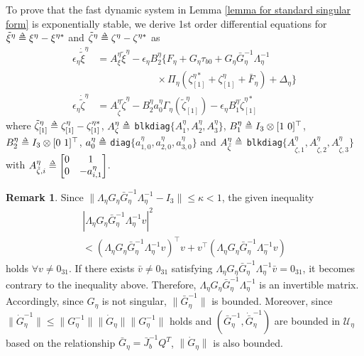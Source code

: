 \documentclass[letterpaper, 10 pt, conference]{ieeeconf}  %
\def\delequal{\mathrel{\ensurestackMath{\stackon[1pt]{=}{\scriptscriptstyle\Delta}}}}
\theoremstyle{definition}
\newtheorem{remark}{Remark}
\begin{document}
To prove that the fast dynamic system in Lemma \ref{lemma for standard singular form} is exponentially stable, we derive 1st order differential equations for $\tilde{\xi}^{\eta} \delequal \xi^{\eta}-\xi^{\eta *}$ and $\tilde{\zeta}^{\eta} \delequal \zeta^{\eta}-\zeta^{\eta *}$ as
\begin{equation} \label{eq: error dynamics of xi and zeta}
    \begin{split}
         \epsilon_{\eta}\dot{\tilde{\xi}}^{\eta} &= A^{\eta}_{\xi}\tilde{\xi}^{\eta} - \epsilon_{\eta} B^{\eta}_2 \{ F_{\eta} + G_{\eta} \tau_{b 0} + G_{\eta}\bar{G}_{\eta}^{-1}\Lambda_{\eta}^{-1} \\ & \qquad \qquad \qquad \times \Pi_{\eta}(\zeta^{\eta *}_{[1]} + \zeta^{\eta}_{[1]} + \bar{F}_{\eta}) + \Delta_{\eta} \} \\
         \epsilon_{\eta}\dot{\tilde{\zeta}}^{\eta} &= A^{\eta}_{\tilde{\zeta}}\tilde{\zeta}^{\eta} - B^{\eta}_2 a^{\eta}_0 \Gamma_{\eta}(\tilde{\zeta}^{\eta}_{[1]}) - \epsilon_{\eta}B^{\eta}_{1}\dot{\zeta}^{\eta *}_{[1]}
    \end{split}
\end{equation}
where $\tilde{\zeta}^{\eta}_{[1]} \delequal \zeta^{\eta}_{[1]} - \zeta^{\eta *}_{[1]}$, $A^{\eta}_{\zeta} \delequal$ \verb|blkdiag|$\{ A^{\eta}_1, A^{\eta}_2, A^{\eta}_3 \}$, $B^{\eta}_1 \delequal I_3 \otimes [1 \ 0]^{\top}$, $B^{\eta}_2 \delequal I_3 \otimes [0 \ 1]^{\top}$, $a^{\eta}_0 \delequal$ \verb|diag|$\{ a^{\eta}_{1, 0}, a^{\eta}_{2, 0}, a^{\eta}_{3, 0} \}$ and $A^{\eta}_{\tilde{\zeta}} \delequal$ \verb|blkdiag|$\{ A^{\eta}_{\tilde{\zeta}, 1}, A^{\eta}_{\tilde{\zeta}, 2}, A^{\eta}_{\tilde{\zeta}, 3} \}$ with $ A^{\eta}_{\tilde{\zeta}, i} \delequal
    \begin{bmatrix}
        0 & 1 \\
        0 & -a^{\eta}_{i, 1}
    \end{bmatrix}$.
\begin{remark} \label{remark: boundness of G_eta and Gbar_eta}
Since $\| \Lambda_{\eta}G_{\eta}\bar{G}^{-1}_{\eta}\Lambda_{\eta}^{-1} - I_3 \| \leq \kappa < 1$, the given inequality
\begin{multline*}
    | \Lambda_{\eta}G_{\eta}\bar{G}^{-1}_{\eta}\Lambda_{\eta}^{-1} v |^2 \\< (\Lambda_{\eta}G_{\eta}\bar{G}^{-1}_{\eta}\Lambda_{\eta}^{-1} v)^{\top} v + v^{\top} (\Lambda_{\eta}G_{\eta}\bar{G}^{-1}_{\eta}\Lambda_{\eta}^{-1} v)     
\end{multline*}
holds $\forall v \neq 0_{3 1}$. If there exists $\bar{v} \neq 0_{3 1}$ satisfying $\Lambda_{\eta}G_{\eta}\bar{G}^{-1}_{\eta}\Lambda_{\eta}^{-1} \bar{v} = 0_{3 1}$, it becomes contrary to the inequality above. Therefore, $\Lambda_{\eta}G_{\eta}\bar{G}^{-1}_{\eta}\Lambda_{\eta}^{-1}$ is an invertible matrix. Accordingly, since $G_{\eta}$ is not singular, $\| \bar{G}^{-1}_{\eta} \|$ is bounded. Moreover, since $\| \dot{G}^{-1}_{\eta} \| \leq \| G^{-1}_{\eta} \| \| \dot{G}_{\eta} \| \| G^{-1}_{\eta} \| $ holds and $(\bar{G}^{-1}_{\eta}, \dot{\bar{G}}^{-1}_{\eta})$ are bounded in $\mathcal{U}_{\eta}$ based on the relationship $\bar{G}_{\eta} = \bar{J}_{b}^{-1}Q^{T}$, $\| \dot{G}_{\eta}\|$ is also bounded.
\end{remark}
\end{document}
